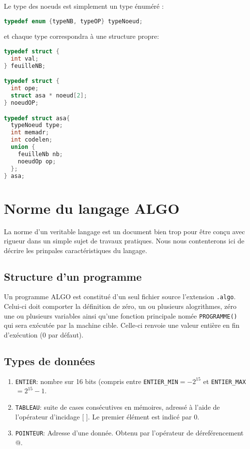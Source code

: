 \documentclass[a4paper,10pt, oneside]{article}
\begin{document}
Le type des noeuds est simplement un type énuméré :

\begin{lstlisting}[language=C]
  typedef enum {typeNB, typeOP} typeNoeud;
\end{lstlisting}

et chaque type correspondra à une structure propre:

\begin{lstlisting}[language=C]
typedef struct {
  int val;
} feuilleNB;

typedef struct {
  int ope;
  struct asa * noeud[2];
} noeudOP;

typedef struct asa{
  typeNoeud type;
  int memadr;
  int codelen;
  union {
    feuilleNb nb;
    noeudOp op;
  };
} asa;
\end{lstlisting}

\section*{Norme du langage ALGO}

La norme d'un veritable langage est un document bien trop pour être
conçu avec rigueur dans un simple sujet de travaux pratiques. Nous
nous contenterons ici de décrire les prinpales caractéristiques du
langage.


\subsection*{Structure d'un programme}

Un programme ALGO est constitué d'un seul fichier source l'extension
\texttt{.algo}. Celui-ci doit comporter la définition de zéro, un ou
plusieurs alogrithmes, zéro une ou plusieurs variables ainsi qu'une
fonction principale nomée \texttt{PROGRAMME()} qui sera exécutée par
la machine cible. Celle-ci  renvoie une valeur entière en fin
d'exécution (0 par défaut).

\subsection*{Types de données}

\begin{enumerate}
\item \texttt{ENTIER}: nombre sur 16 bits (compris entre
  \texttt{ENTIER\_MIN}$=-2^{15}$ et \texttt{ENTIER\_MAX}$=2^{15}-1$. 
\item \texttt{TABLEAU}: suite de cases consécutives en mémoires,
  adressé à l'aide de l'opérateur d'incidage [ ]. Le premier élément
  est indicé par 0.
\item \texttt{POINTEUR}: Adresse d'une donnée. Obtenu par l'opérateur
  de déreférencement @.
  
\end{enumerate}
\end{document}

